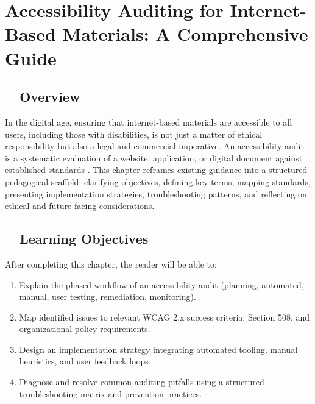 \chapter{Accessibility Auditing for Internet-Based Materials: A Comprehensive Guide}
\label{chap:accessibility-auditing}

\section{~~Overview}\label{sec:intro-auditing}
In the digital age, ensuring that internet-based materials are accessible to all users, including those with disabilities, is not just a matter of ethical responsibility but also a legal and commercial imperative. An accessibility audit is a systematic evaluation of a website, application, or digital document against established  standards \supercite{DisabilityRightsAuditing}. This chapter reframes existing guidance into a structured pedagogical scaffold: clarifying objectives, defining key terms, mapping standards, presenting implementation strategies, troubleshooting patterns, and reflecting on ethical and future-facing considerations.

\section{~~Learning Objectives}\label{sec:learning-objectives-auditing}
After completing this chapter, the reader will be able to:
\begin{enumerate}
	\item Explain the phased workflow of an accessibility audit (planning, automated, manual, user testing, remediation, monitoring).
	\item Map identified issues to relevant WCAG 2.x success criteria, Section 508, and organizational policy requirements.
	\item Design an implementation strategy integrating automated tooling, manual heuristics, and user feedback loops.
	\item Diagnose and resolve common auditing pitfalls using a structured troubleshooting matrix and prevention practices.
\end{enumerate}

